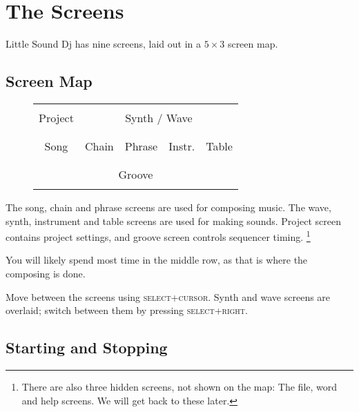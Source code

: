 \chapter{The Screens}
Little Sound Dj has nine screens, laid out in a \begin{math} 5 \times 3 \end{math} screen map.

\section{Screen Map}

\begin{figure}[htbp]
\centering
\begin{tabular}{|c|c|c|c|c|}
        \cline{0-4}
	& \multicolumn{4}{|c|}{ } \\
	Project & \multicolumn{4}{|c|}{Synth / Wave} \\
	& \multicolumn{4}{|c|}{ } \\
        \cline{0-4}
        & & & & \\
        Song & Chain & Phrase & Instr. & Table \\
        & & & & \\
        \cline{0-4}
        \multicolumn{5}{|c|}{} \\
        \multicolumn{5}{|c|}{Groove} \\
        \multicolumn{5}{|c|}{} \\
        \cline{0-4}
\end{tabular}
\end{figure}

The song, chain and phrase screens are used for composing music. The wave, synth,
instrument and table screens are used for making sounds.
Project screen contains project settings, and groove screen controls sequencer timing.
\footnote{There are also three hidden
screens, not shown on the map: The file, word and help screens. We will get back to these later.}

You will likely spend most time in the middle row, as that is where the composing is done.

Move between the screens using \textsc{select+cursor}. Synth and wave screens are overlaid; switch between them by pressing \textsc{select+right}.

\section{Starting and Stopping}

